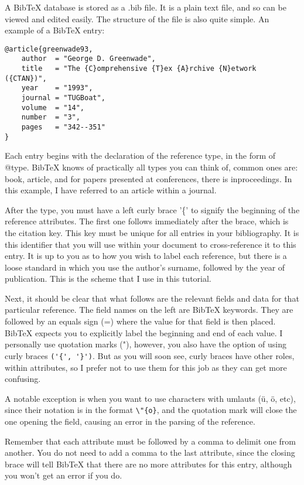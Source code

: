 A BibTeX database is stored as a .bib file. It is a plain text file, and so can be viewed and edited easily. The structure of the file is also quite simple. An example of a BibTeX entry:

\begin{verbatim}
@article{greenwade93,
    author  = "George D. Greenwade",
    title   = "The {C}omprehensive {T}ex {A}rchive {N}etwork ({CTAN})",
    year    = "1993",
    journal = "TUGBoat",
    volume  = "14",
    number  = "3",
    pages   = "342--351"
}
\end{verbatim}

Each entry begins with the declaration of the reference type, in the form of @type. BibTeX knows of practically all types you can think of, common ones are: book, article, and for papers presented at conferences, there is inproceedings. In this example, I have referred to an article within a journal.

After the type, you must have a left curly brace '\{' to signify the beginning of the reference attributes. The first one follows immediately after the brace, which is the citation key. This key must be unique for all entries in your bibliography. It is this identifier that you will use within your document to cross-reference it to this entry. It is up to you as to how you wish to label each reference, but there is a loose standard in which you use the author's surname, followed by the year of publication. This is the scheme that I use in this tutorial.

Next, it should be clear that what follows are the relevant fields and data for that particular reference. The field names on the left are BibTeX keywords. They are followed by an equals sign (=) where the value for that field is then placed. BibTeX expects you to explicitly label the beginning and end of each value. I personally use quotation marks ("), however, you also have the option of using curly braces \verb+('{', '}')+. But as you will soon see, curly braces have other roles, within attributes, so I prefer not to use them for this job as they can get more confusing. 

A notable exception is when you want to use characters with umlauts (ü, ö, etc), since their notation is in the format \verb+\"{o}+, and the quotation mark will close the one opening the field, causing an error in the parsing of the reference.

Remember that each attribute must be followed by a comma to delimit one from another. You do not need to add a comma to the last attribute, since the closing brace will tell BibTeX that there are no more attributes for this entry, although you won't get an error if you do.

